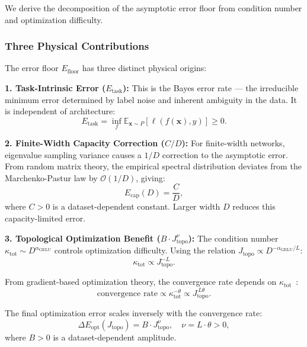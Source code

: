 We derive the decomposition of the asymptotic error floor from condition number and optimization difficulty.

\subsubsection{Three Physical Contributions}

The error floor $E_{\mathrm{floor}}$ has three distinct physical origins:

\textbf{1. Task-Intrinsic Error ($E_{\mathrm{task}}$):}
This is the Bayes error rate --- the irreducible minimum error determined by label noise and inherent ambiguity in the data. It is independent of architecture:
\begin{equation}
E_{\mathrm{task}} = \inf_{f} \mathbb{E}_{\mathbf{x}\sim P}[\ell(f(\mathbf{x}), y)] \geq 0.
\end{equation}

\textbf{2. Finite-Width Capacity Correction ($C/D$):}
For finite-width networks, eigenvalue sampling variance causes a $1/D$ correction to the asymptotic error. From random matrix theory, the empirical spectral distribution deviates from the Marchenko-Pastur law by $\mathcal{O}(1/D)$, giving:
\begin{equation}
E_{\mathrm{cap}}(D) = \frac{C}{D},
\end{equation}
where $C > 0$ is a dataset-dependent constant. Larger width $D$ reduces this capacity-limited error.

\textbf{3. Topological Optimization Benefit ($B \cdot J_{\mathrm{topo}}^{\nu}$):}
The condition number $\kappa_{\mathrm{tot}} \sim D^{\alpha_{\mathrm{GELU}}}$ controls optimization difficulty. Using the relation $J_{\mathrm{topo}} \propto D^{-\alpha_{\mathrm{GELU}}/L}$:
\begin{equation}
\kappa_{\mathrm{tot}} \propto J_{\mathrm{topo}}^{-L}.
\end{equation}

From gradient-based optimization theory, the convergence rate depends on $\kappa_{\mathrm{tot}}$~\citep{boyd2004convex}:
\begin{equation}
\text{convergence rate} \propto \kappa_{\mathrm{tot}}^{-\theta} \propto J_{\mathrm{topo}}^{\,L\theta}.
\end{equation}

The final optimization error scales inversely with the convergence rate:
\begin{equation}
\Delta E_{\mathrm{opt}}(J_{\mathrm{topo}}) = B \cdot J_{\mathrm{topo}}^{\nu}, \quad \nu = L \cdot \theta > 0,
\end{equation}
where $B > 0$ is a dataset-dependent amplitude.

